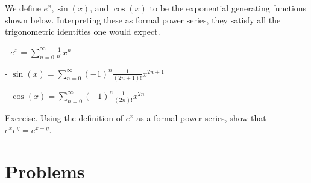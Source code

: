 \documentclass[12pt]{exam}
\begin{document}
We define $e^{x}, \sin (x)$, and $\cos (x)$ to be the exponential generating functions shown below. Interpreting these as formal power series, they satisfy all the trigonometric identities one would expect.

- $e^{x}=\sum_{n=0}^{\infty} \frac{1}{n !} x^{n}$

- $\sin (x)=\sum_{n=0}^{\infty}(-1)^{n} \frac{1}{(2 n+1) !} x^{2 n+1}$

- $\cos (x)=\sum_{n=0}^{\infty}(-1)^{n} \frac{1}{(2 n) !} x^{2 n}$

Exercise. Using the definition of $e^{x}$ as a formal power series, show that $e^{x} e^{y}=e^{x+y}$.

\section{Problems}
\end{document}
